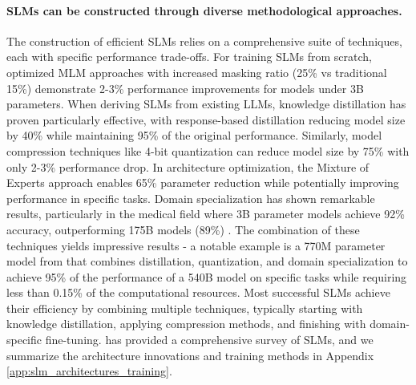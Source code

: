 \paragraph{SLMs can be constructed through diverse methodological approaches.}
The construction of efficient SLMs relies on a comprehensive suite of techniques, each with specific performance trade-offs. 
For training SLMs from scratch, optimized MLM approaches \cite{devlin2019bert} with increased masking ratio (25\% vs traditional 15\%) demonstrate 2-3\% performance improvements for models under 3B parameters.
When deriving SLMs from existing LLMs, knowledge distillation has proven particularly effective, with response-based distillation \cite{sanh2019distilbert} reducing model size by 40\% while maintaining 95\% of the original performance. Similarly, model compression techniques like 4-bit quantization \cite{zhang2022quantized} can reduce model size by 75\% with only 2-3\% performance drop.
In architecture optimization, the Mixture of Experts approach \cite{fedus2022switch} enables 65\% parameter reduction while potentially improving performance in specific tasks. Domain specialization has shown remarkable results, particularly in the medical field where 3B parameter models achieve 92\% accuracy, outperforming 175B models (89\%) \cite{fu2023specializing}.
The combination of these techniques yields impressive results - a notable example is a 770M parameter model from \cite{distilling2023} that combines distillation, quantization, and domain specialization to achieve 95\% of the performance of a 540B model on specific tasks while requiring less than 0.15\% of the computational resources. Most successful SLMs achieve their efficiency by combining multiple techniques, typically starting with knowledge distillation, applying compression methods, and finishing with domain-specific fine-tuning. 
\citet{wang2024comprehensive} has provided a comprehensive survey of SLMs, and we summarize the architecture innovations and training methods in Appendix \ref{app:slm_architectures_training}. 

